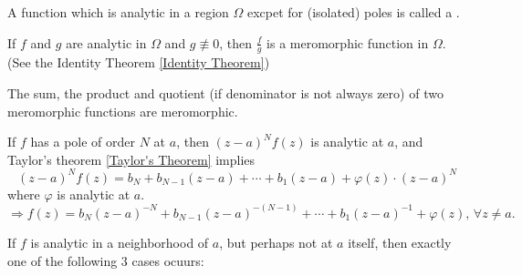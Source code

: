 \begin{definition}
    A function which is analytic in a region $ \Omega $ excpet for (isolated) poles is called a .
\end{definition}
\begin{example}
    If  $ f $ and  $ g $ are analytic in  $ \Omega $ and  $ g\not\equiv 0 $, then  $ \frac{f}{g} $ is a meromorphic function in  $ \Omega $. (See the Identity Theorem \ref{Identity Theorem})
\end{example}
\begin{remark}
    The sum, the product and quotient (if denominator is not always zero) of two meromorphic functions are meromorphic.
\end{remark}
If  $ f $ has a pole of order  $ N $ at  $ a $, then  $ (z-a)^Nf(z) $ is analytic at  $ a $, and Taylor's theorem \ref{Taylor's Theorem} implies 
\begin{equation}
    (z-a)^Nf(z)=b_N+b_{N-1}(z-a)+\cdots+b_1(z-a)+\varphi(z)\cdot(z-a)^N
\end{equation}
where  $ \varphi $ is analytic at  $ a $.
\begin{equation}
    \Rightarrow  f(z)=b_N(z-a)^{-N}+b_{N-1}(z-a)^{-(N-1)}+\cdots+b_1(z-a)^{-1}+\varphi(z),\,\forall z\not= a . 
\end{equation} 
\begin{theorem}
    If  $ f $ is analytic in a neighborhood of  $ a $, but perhaps not at  $ a $ itself, then exactly one of the following  $ 3 $ cases ocuurs:
\end{theorem} 